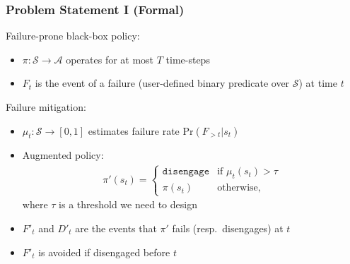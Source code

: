 \documentclass[handout]{beamer}
\begin{document}


\begin{frame}
    \frametitle{Problem Statement I (Formal)}
    Failure-prone black-box policy:
        \begin{itemize}
        \item $\pi: \mathcal{S} \rightarrow \mathcal{A}$ operates for at most $T$ time-steps
        \item $F_t$ is the event of a failure (user-defined binary predicate over $\mathcal{S}$) at time $t$
        \end{itemize}
    Failure mitigation:
        \begin{itemize}
        \item $\mu_t: \mathcal{S} \rightarrow [0,1]$ estimates failure rate $\text{Pr}(F_{>t}|s_t)$
        \item Augmented policy:
        \begin{align}
            \pi'(s_t) = \begin{cases}
                \texttt{disengage} & \text{if } \mu_t(s_t) > \tau \\
                \pi(s_t) & \text{otherwise,}
            \end{cases}
        \end{align}
        where $\tau$ is a threshold we need to design
        \item $F'_t$ and $D'_t$ are the events that $\pi'$ fails (resp.~disengages) at $t$
        \item $F'_t$ is avoided if disengaged before $t$
        \end{itemize}
\end{frame}
\end{document}
